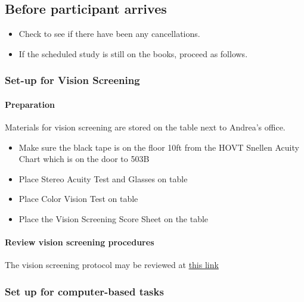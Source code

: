 \documentclass[]{article}
\providecommand{\tightlist}{%
  \setlength{\itemsep}{0pt}\setlength{\parskip}{0pt}}
\let\oldparagraph\paragraph
\renewcommand{\paragraph}[1]{\oldparagraph{#1}\mbox{}}
\begin{document}
\hypertarget{before-participant-arrives}{%
\subsection{Before participant
arrives}\label{before-participant-arrives}}

\begin{itemize}
\tightlist
\item
  Check to see if there have been any cancellations.
\item
  If the scheduled study is still on the books, proceed as follows.
\end{itemize}

\hypertarget{set-up-for-vision-screening}{%
\subsubsection{Set-up for Vision
Screening}\label{set-up-for-vision-screening}}

\hypertarget{preparation}{%
\paragraph{Preparation}\label{preparation}}

Materials for vision screening are stored on the table next to Andrea's
office.

\begin{itemize}
\tightlist
\item
  Make sure the black tape is on the floor 10ft from the HOVT Snellen
  Acuity Chart which is on the door to 503B
\item
  Place Stereo Acuity Test and Glasses on table
\item
  Place Color Vision Test on table
\item
  Place the Vision Screening Score Sheet on the table
\end{itemize}

\hypertarget{review-vision-screening-procedures}{%
\paragraph{Review vision screening
procedures}\label{review-vision-screening-procedures}}

The vision screening protocol may be reviewed at
\href{vision-screening-protocol.html}{this link}

\hypertarget{set-up-for-computer-based-tasks}{%
\subsubsection{Set up for computer-based
tasks}\label{set-up-for-computer-based-tasks}}
\end{document}
